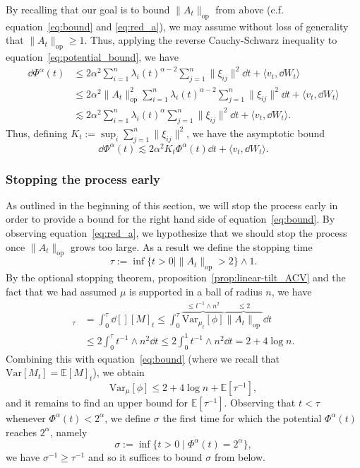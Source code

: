 By recalling that our goal is to bound \(\|A_t\|_{\text{op}}\) from above (c.f. equation~\eqref{eq:bound} and \eqref{eq:red_a}), 
we may assume without loss of generality that \(\|A_t\|_{\text{op}} \ge 1\). Thus, applying the reverse Cauchy-Schwarz inequality to 
equation~\eqref{eq:potential_bound}, we have
\begin{align*}
  \dd \Phi^\alpha(t) & \le 2\alpha^2 \sum_{i = 1}^n \lambda_i(t)^{\alpha - 2} \sum_{j = 1}^n \|\xi_{ij}\|^2 \dd t + \langle v_t, \dd W_t\rangle\\
    & \le 2\alpha^2 \|A_t\|_{\text{op}}^2 \sum_{i = 1}^n \lambda_i(t)^{\alpha - 2} \sum_{j = 1}^n \|\xi_{ij}\|^2 \dd t + \langle v_t, \dd W_t\rangle\\
    & \lesssim 2\alpha^2\sum_{i = 1}^n \lambda_i(t)^\alpha \sum_{j = 1}^n \|\xi_{ij}\|^2 \dd t + \langle v_t, \dd W_t\rangle.
\end{align*} 
Thus, defining \(K_t := \sup_i \sum_{j = 1}^n \|\xi_{ij}\|^2\), we have the asymptotic bound 
\begin{equation}\label{eq:potential_bound_2}
  \dd \Phi^\alpha(t) \lesssim 2\alpha^2 K_t \Phi^\alpha(t) \dd t + \langle v_t, \dd W_t\rangle.
\end{equation}

\subsubsection{Stopping the process early}

As outlined in the beginning of this section, we will stop the process early in order to provide a 
bound for the right hand side of equation~\eqref{eq:bound}. By observing equation~\eqref{eq:red_a}, we hypothesize that
we should stop the process once \(\|A_t\|_{\text{op}}\) grows too large. As a result we define the stopping time 
\[\tau := \inf\{t > 0 \mid \|A_t\|_{\text{op}} > 2\} \wedge 1.\]
By the optional stopping theorem, proposition~\ref{prop:linear-tilt_ACV} and the fact that we had assumed 
\(\mu\) is supported in a ball of radius \(n\), we have
\begin{align*}
  [M]_\tau & = \int_0^\tau \dd[] [M]_t 
      \le \int_0^\tau \overbrace{\text{Var}_{\mu_t}[\phi]}^{\le t^{-1} \wedge n^2} \overbrace{\|A_t\|_{\text{op}}}^{\le 2} \dd t\\
    & \le 2 \int_0^\tau t^{-1} \wedge n^2 \dd t \le 2 \int_0^1 t^{-1} \wedge n^2 \dd t = 2 + 4 \log n.
\end{align*}
Combining this with equation~\eqref{eq:bound} (where we recall that \(\text{Var}[M_t] = \mathbb{E}[M]_t\)),  we obtain
\begin{equation}\label{eq:tau_bd}
  \text{Var}_\mu[\phi] \le 2 + 4 \log n + \mathbb{E}[\tau^{-1}],
\end{equation}
and it remains to find an upper bound for \(\mathbb{E}[\tau^{-1}]\). Observing that \(t < \tau\) whenever 
\(\Phi^\alpha(t) < 2^\alpha\), we define \(\sigma\) the first time for which the potential \(\Phi^\alpha(t)\) reaches \(2^\alpha\),
namely
\[\sigma := \inf \{t > 0 \mid \Phi^\alpha(t) = 2^\alpha\},\] 
we have \(\sigma^{-1} \ge \tau^{-1}\) and so it suffices to bound \(\sigma\) from below. 

